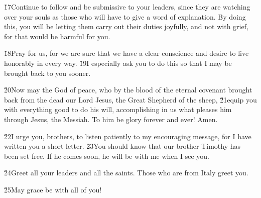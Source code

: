 \v{17}Continue to follow and be submissive to your leaders, since they are watching over your souls as those who will have to give a word of explanation. By doing this, you will be letting them carry out their duties joyfully, and not with grief, for that would be harmful for you.

\v{18}Pray for us, for we are sure that we have a clear conscience and desire to live honorably in every way. \v{19}I especially ask you to do this so that I may be brought back to you sooner.

\v{20}Now may the God of peace, who by the blood of the eternal covenant brought back from the dead our Lord Jesus, the Great Shepherd of the sheep, \v{21}equip you with everything good to do his will, accomplishing in us what pleases him through Jesus, the Messiah. To him be glory forever and ever! Amen.

\v{22}I urge you, brothers, to listen patiently to my encouraging message, for I have written you a short letter. \v{23}You should know that our brother Timothy has been set free. If he comes soon, he will be with me when I see you.

\v{24}Greet all your leaders and all the saints. Those who are from Italy greet you.

\v{25}May grace be with all of you!
